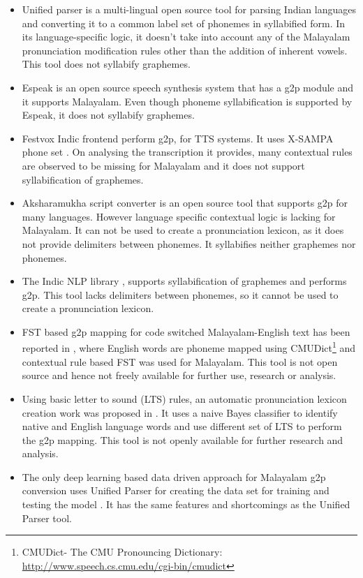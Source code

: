 \documentclass{ieeeaccess}
\begin{document}
\begin{itemize}
    \item Unified parser \cite{baby2016unified} is a multi-lingual open source tool for parsing Indian languages and converting it to a common label set of phonemes in syllabified form. In its language-specific logic, it doesn't take into account any of the Malayalam pronunciation modification rules other than the addition of inherent vowels. This tool does not syllabify graphemes.
    \item Espeak \cite{duddington2012espeak} is an open source speech synthesis system that has a g2p module and it supports Malayalam. Even though phoneme syllabification is supported by Espeak, it does not syllabify graphemes.
    \item Festvox Indic frontend perform g2p, for TTS systems. It uses X-SAMPA phone set \cite{parlikar2016festvox}. On analysing the transcription it provides,  many contextual rules are observed to be missing for Malayalam and it does not support syllabification of graphemes. 
    \item Aksharamukha \cite{aksharamukha} script converter is an open source tool that supports g2p for many languages. However language specific contextual logic is lacking for Malayalam. It can not be used to create a pronunciation lexicon, as it does not provide delimiters between phonemes. It syllabifies neither graphemes nor phonemes.
    \item The Indic NLP library \cite{kunchukuttan2020indicnlp}, supports syllabification of graphemes and performs g2p. This tool lacks delimiters between phonemes, so it cannot be used to create a pronunciation lexicon.
    \item
     FST based g2p mapping for code switched Malayalam-English text has been reported in \cite{manghat2020malayalam}, where English words are phoneme mapped using CMUDict\footnote{CMUDict- The CMU Pronouncing Dictionary: \url{http://www.speech.cs.cmu.edu/cgi-bin/cmudict}} and contextual rule based FST was used for Malayalam. This tool is not open source and hence not freely available for further use, research or analysis.
    \item
    Using basic letter to sound (LTS) rules, an automatic pronunciation lexicon creation work was proposed in \cite{aswathy2014improving}. It uses a naive Bayes classifier to identify native and English language words and use different set of LTS to perform the g2p mapping. This tool is not openly available for further research and analysis.
     \item The only deep learning based data driven approach for Malayalam g2p conversion uses Unified Parser for creating the data set for training and testing the model \cite{Priyamvada_2021}. It has the same features and shortcomings as the Unified Parser tool.
\end{itemize}
\end{document}
